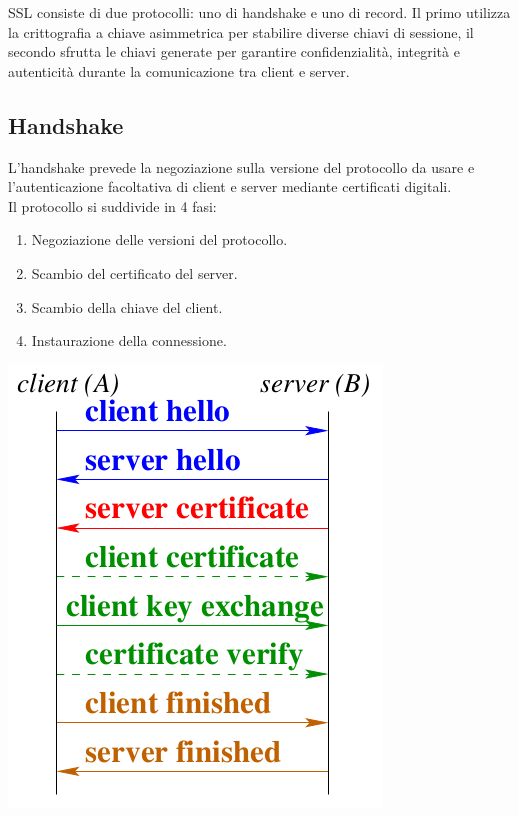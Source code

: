 \documentclass[a4paper, 11pt, notitlepage, fleqn]{report}
\begin{document}
SSL consiste di due protocolli: uno di handshake e uno di record. Il primo utilizza la crittografia a chiave asimmetrica per stabilire diverse chiavi di sessione, il secondo sfrutta le chiavi generate per garantire confidenzialità, integrità e autenticità durante la comunicazione tra client e server.

\subsection{Handshake}
\begin{minipage}{.65\textwidth}
	L'handshake prevede la negoziazione sulla versione del protocollo da usare e l'autenticazione facoltativa di client e server mediante certificati digitali.\\
	Il protocollo si suddivide in 4 fasi:
	\begin{enumerate}
		\item Negoziazione delle versioni del protocollo.
		\item Scambio del certificato del server.
		\item Scambio della chiave del client.
		\item Instaurazione della connessione.
	\end{enumerate}
\end{minipage}
\begin{minipage}{.35\textwidth}
	\centering
	\includegraphics[width=.95\textwidth]{images/SSL}
\end{minipage}
\end{document}
